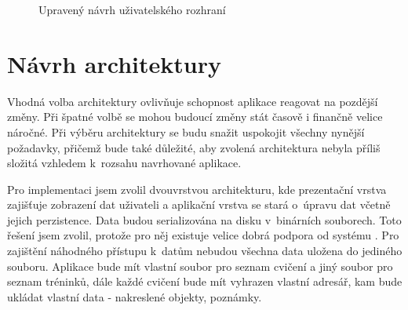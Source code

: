 \documentclass[thesis=B,czech]{FITthesis}[2012/06/26]
\begin{document}
	\begin{figure}[h!t]
		\centering
 		\hfil

 		\caption{Upravený návrh uživatelského rozhraní}
 		\label{pic:wireframes2}
	\end{figure}

\section{Návrh architektury}

	Vhodná volba architektury ovlivňuje schopnost aplikace reagovat na pozdější změny. Při špatné volbě se mohou budoucí změny stát časově i finančně velice náročné. Při výběru architektury se budu snažit uspokojit všechny nynější požadavky, přičemž bude také důležité, aby zvolená architektura nebyla příliš složitá vzhledem k~rozsahu navrhované aplikace.

	Pro implementaci jsem zvolil dvouvrstvou architekturu, kde prezentační vrstva zajišťuje zobrazení dat uživateli a aplikační vrstva se stará o~úpravu dat včetně jejich perzistence. Data budou serializována na disku v~binárních souborech. Toto řešení jsem zvolil, protože pro něj existuje velice dobrá podpora od systému \cite{nsCodingOnline}. Pro zajištění náhodného přístupu k~datům nebudou všechna data uložena do jediného souboru. Aplikace bude mít vlastní soubor pro seznam cvičení a jiný soubor pro seznam tréninků, dále každé cvičení bude mít vyhrazen vlastní adresář, kam bude ukládat vlastní data \-- nakreslené objekty, poznámky.
\end{document}
